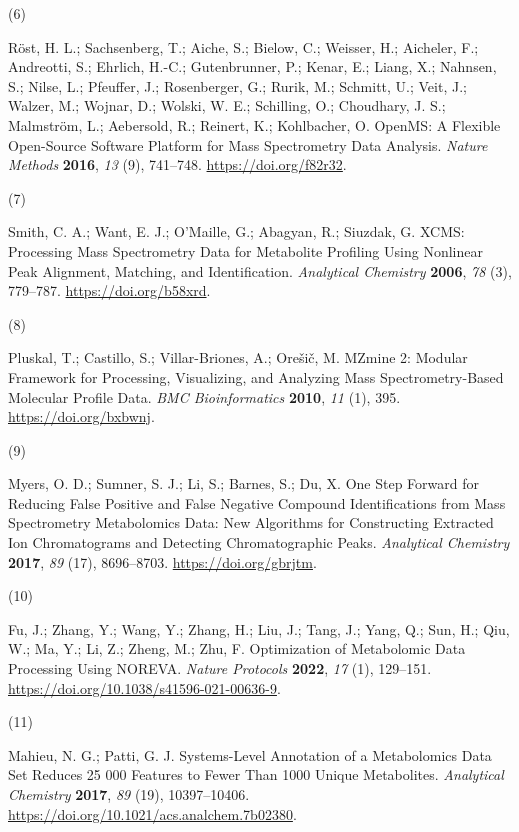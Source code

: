 \documentclass[
]{article}
\newlength{\cslhangindent}
\newlength{\csllabelwidth}
\newlength{\cslentryspacingunit} %
\newenvironment{CSLReferences}[2] %
 {%
  \setlength{\parindent}{0pt}
  \ifodd #1
  \let\oldpar\par
  \def\par{\hangindent=\cslhangindent\oldpar}
  \fi
  \setlength{\parskip}{#2\cslentryspacingunit}
 }%
 {}
\newcommand{\CSLLeftMargin}[1]{\parbox[t]{\csllabelwidth}{#1}}
\newcommand{\CSLRightInline}[1]{\parbox[t]{\linewidth - \csllabelwidth}{#1}\break}
\begin{document}
\begin{CSLReferences}{0}{0}
\leavevmode{}%
\CSLLeftMargin{(6) }%
\CSLRightInline{Röst, H. L.; Sachsenberg, T.; Aiche, S.; Bielow, C.;
Weisser, H.; Aicheler, F.; Andreotti, S.; Ehrlich, H.-C.; Gutenbrunner,
P.; Kenar, E.; Liang, X.; Nahnsen, S.; Nilse, L.; Pfeuffer, J.;
Rosenberger, G.; Rurik, M.; Schmitt, U.; Veit, J.; Walzer, M.; Wojnar,
D.; Wolski, W. E.; Schilling, O.; Choudhary, J. S.; Malmström, L.;
Aebersold, R.; Reinert, K.; Kohlbacher, O. {OpenMS}: A Flexible
Open-Source Software Platform for Mass Spectrometry Data Analysis.
\emph{Nature Methods} \textbf{2016}, \emph{13} (9), 741--748.
\url{https://doi.org/f82r32}.}

\leavevmode{}%
\CSLLeftMargin{(7) }%
\CSLRightInline{Smith, C. A.; Want, E. J.; O'Maille, G.; Abagyan, R.;
Siuzdak, G. {XCMS}: {Processing Mass Spectrometry Data} for {Metabolite
Profiling Using Nonlinear Peak Alignment}, {Matching}, and
{Identification}. \emph{Analytical Chemistry} \textbf{2006}, \emph{78}
(3), 779--787. \url{https://doi.org/b58xrd}.}

\leavevmode{}%
\CSLLeftMargin{(8) }%
\CSLRightInline{Pluskal, T.; Castillo, S.; Villar-Briones, A.; Orešič,
M. {MZmine} 2: {Modular} Framework for Processing, Visualizing, and
Analyzing Mass Spectrometry-Based Molecular Profile Data. \emph{BMC
Bioinformatics} \textbf{2010}, \emph{11} (1), 395.
\url{https://doi.org/bxbwnj}.}

\leavevmode{}%
\CSLLeftMargin{(9) }%
\CSLRightInline{Myers, O. D.; Sumner, S. J.; Li, S.; Barnes, S.; Du, X.
One {Step Forward} for {Reducing False Positive} and {False Negative
Compound Identifications} from {Mass Spectrometry Metabolomics Data}:
{New Algorithms} for {Constructing Extracted Ion Chromatograms} and
{Detecting Chromatographic Peaks}. \emph{Analytical Chemistry}
\textbf{2017}, \emph{89} (17), 8696--8703.
\url{https://doi.org/gbrjtm}.}

\leavevmode{}%
\CSLLeftMargin{(10) }%
\CSLRightInline{Fu, J.; Zhang, Y.; Wang, Y.; Zhang, H.; Liu, J.; Tang,
J.; Yang, Q.; Sun, H.; Qiu, W.; Ma, Y.; Li, Z.; Zheng, M.; Zhu, F.
Optimization of Metabolomic Data Processing Using {NOREVA}. \emph{Nature
Protocols} \textbf{2022}, \emph{17} (1), 129--151.
\url{https://doi.org/10.1038/s41596-021-00636-9}.}

\leavevmode{}%
\CSLLeftMargin{(11) }%
\CSLRightInline{Mahieu, N. G.; Patti, G. J. Systems-{Level Annotation}
of a {Metabolomics Data Set Reduces} 25 000 {Features} to {Fewer} Than
1000 {Unique Metabolites}. \emph{Analytical Chemistry} \textbf{2017},
\emph{89} (19), 10397--10406.
\url{https://doi.org/10.1021/acs.analchem.7b02380}.}


\end{CSLReferences}
\end{document}
